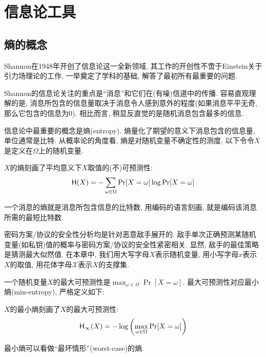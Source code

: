 \section{信息论工具}
\subsection{熵的概念}
Shannon在1948年开创了信息论这一全新领域, 其工作的开创性不啻于Einstein关于引力场理论的工作, 
一举奠定了学科的基础, 解答了最初所有最重要的问题.  
 
Shannon的信息论关注的重点是``消息''和它们在(有噪)信道中的传播. 
容易直观理解的是, 消息所包含的信息量取决于消息令人感到意外的程度(如果消息平平无奇, 那么它包含的信息为0). 
相比而言, 稍显反直觉的是随机消息包含最多的信息. 

信息论中最重要的概念是熵(entropy). 熵量化了期望的意义下消息包含的信息量, 单位通常是比特.    
从概率论的角度看, 熵是对随机变量不确定性的测度.  
以下令令$X$是定义在$\Omega$上的随机变量.
\begin{definition}[熵]
$X$的熵刻画了平均意义下$X$取值的(不)可预测性: 
\begin{equation*}
    \mathsf{H}(X) = - \sum_{\omega \in \Omega} \Pr[X = \omega] \log \Pr[X = \omega]
\end{equation*} 
\end{definition} 

\begin{remark}
一个消息的熵就是消息所包含信息的比特数, 用编码的语言刻画, 就是编码该消息所需的最短比特数.
\end{remark}

密码方案/协议的安全性分析均是针对恶意敌手展开的. 
敌手单次正确预测某随机变量(如私钥)值的概率与密码方案/协议的安全性紧密相关. 显然, 敌手的最佳策略是猜测最大似然值. 
在本章中, 我们用大写字母$X$表示随机变量, 用小写字母$x$表示$X$的取值, 用花体字母$\mathcal{X}$表示$X$的支撑集. 

一个随机变量$X$的最大可预测性是$\max_{\omega \in \Omega} \Pr[X = \omega]$. 
最大可预测性对应最小熵(min-entropy), 严格定义如下:  
\begin{definition}[最小熵]
$X$的最小熵刻画了$X$的最大可预测性: 
\begin{equation*}
    \mathsf{H}_\infty(X) = - \log \left(\max_{\omega \in \Omega} \Pr[X = \omega]\right)
\end{equation*} 
\end{definition} 
\begin{remark}
最小熵可以看做``最坏情形''(worst-case)的熵.
\end{remark}

